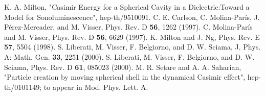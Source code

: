 \documentclass[a4paper,11pt]{article}
\begin{document}
\begin{thebibliography}{99}
 K. A. Milton, "Casimir Energy for a Spherical
 Cavity in a Dielectric:Toward a Model for Sonoluminescence",
 hep-th/9510091.
 C. E. Carlson, C. Molina-Par\'{i}s, J. P\'{e}rez-Mercader,
and M. Visser, Phys. Rev. D {\bf 56}, 1262 (1997).
 C. Molina-Par\'{i}s and M. Visser, Phys. Rev. D {\bf 56},
6629 (1997).
 K. Milton and J. Ng, Phys. Rev. E {\bf 57}, 5504
 (1998).
S. Liberati, M. Visser, F. Belgiorno, and D. W. Sciama,
 J. Phys. A: Math. Gen. {\bf 33}, 2251 (2000).
 S. Liberati, M. Visser, F. Belgiorno, and D. W.
 Sciama, Phys. Rev. D {\bf 61}, 085023 (2000).
 M. R. Setare and A. A. Saharian, "Particle creation
by moving spherical shell in the dynamical Casimir effect",
hep-th/0101149; to appear in Mod. Phys. Lett. A.

\end{thebibliography}
\end{document}

